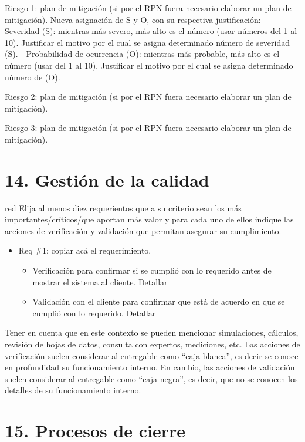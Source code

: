 \documentclass[
11pt, %
]{charter}
\begin{document}
Riesgo 1: plan de mitigación (si por el RPN fuera necesario elaborar un plan de mitigación).
  Nueva asignación de S y O, con su respectiva justificación:
  - Severidad (S): mientras más severo, más alto es el número (usar números del 1 al 10).
          Justificar el motivo por el cual se asigna determinado número de severidad (S).
  - Probabilidad de ocurrencia (O): mientras más probable, más alto es el número (usar del 1 al 10).
          Justificar el motivo por el cual se asigna determinado número de (O).

Riesgo 2: plan de mitigación (si por el RPN fuera necesario elaborar un plan de mitigación).
 
Riesgo 3: plan de mitigación (si por el RPN fuera necesario elaborar un plan de mitigación).




\section{14. Gestión de la calidad}
\label{sec:calidad}

\begin{consigna}{red}
Elija al menos diez requerientos que a su criterio sean los más importantes/críticos/que aportan más valor y para cada uno de ellos indique las acciones de verificación y validación que permitan asegurar su cumplimiento.

\begin{itemize} 
\item Req \#1: copiar acá el requerimiento.

\begin{itemize}
	\item Verificación para confirmar si se cumplió con lo requerido antes de mostrar el sistema al cliente. Detallar 
	\item Validación con el cliente para confirmar que está de acuerdo en que se cumplió con lo requerido. Detallar  
\end{itemize}

\end{itemize}

Tener en cuenta que en este contexto se pueden mencionar simulaciones, cálculos, revisión de hojas de datos, consulta con expertos, mediciones, etc.  Las acciones de verificación suelen considerar al entregable como ``caja blanca'', es decir se conoce en profundidad su funcionamiento interno.  En cambio, las acciones de validación suelen considerar al entregable como ``caja negra'', es decir, que no se conocen los detalles de su funcionamiento interno.

\end{consigna}

\section{15. Procesos de cierre}    
\label{sec:cierre}
\end{document}
